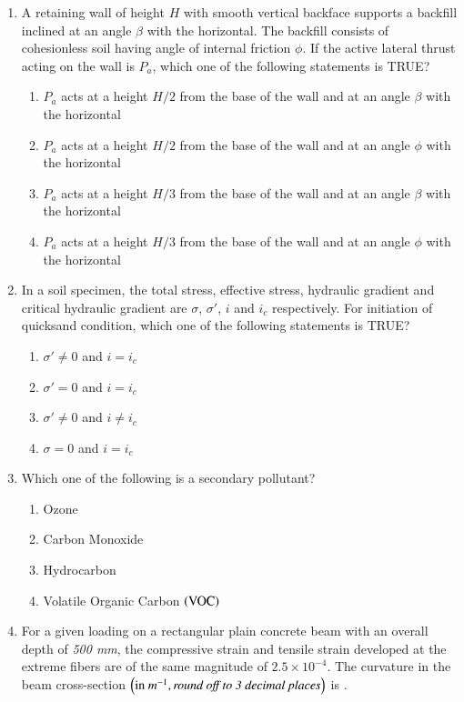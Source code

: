 \documentclass[journal,12pt,onecolumn]{IEEEtran}
\theoremstyle{remark}
\begin{document}
\begin{enumerate}
\item A retaining wall of height $H$ with smooth vertical backface supports a backfill inclined at an angle $\beta$ with the horizontal. The backfill consists of cohesionless soil having angle of internal friction $\phi$. If the active lateral thrust acting on the wall is $P_a$, which one of the following statements is TRUE?

\hfill{}
\begin{enumerate}
\item $P_a$ acts at a height $H/2$ from the base of the wall and at an angle $\beta$ with the horizontal
\item $P_a$ acts at a height $H/2$ from the base of the wall and at an angle $\phi$ with the horizontal
\item $P_a$ acts at a height $H/3$ from the base of the wall and at an angle $\beta$ with the horizontal
\item $P_a$ acts at a height $H/3$ from the base of the wall and at an angle $\phi$ with the horizontal
\end{enumerate}

\item In a soil specimen, the total stress, effective stress, hydraulic gradient and critical hydraulic gradient are $\sigma$, $\sigma'$, $i$ and $i_c$ respectively. For initiation of quicksand condition, which one of the following statements is TRUE?

\hfill{}
\begin{enumerate}
\item $\sigma' \neq 0$ and $i = i_c$
\item $\sigma' = 0$ and $i = i_c$
\item $\sigma' \neq 0$ and $i \neq i_c$
\item $\sigma = 0$ and $i = i_c$
\end{enumerate}

\item Which one of the following is a secondary pollutant?

\hfill{}
\begin{enumerate}
\item Ozone
\item Carbon Monoxide
\item Hydrocarbon
\item Volatile Organic Carbon $\left(\text{VOC}\right)$
\end{enumerate}

\item For a given loading on a rectangular plain concrete beam with an overall depth of \textit{500 mm}, the compressive strain and tensile strain developed at the extreme fibers are of the same magnitude of $2.5 \times 10^{-4}$. The curvature in the beam cross-section $\left(\text{in } m^{-1}, \textit{round off to 3 decimal places}\right)$ is \underline{\hspace{3cm}}.


\end{enumerate}
\end{document}
